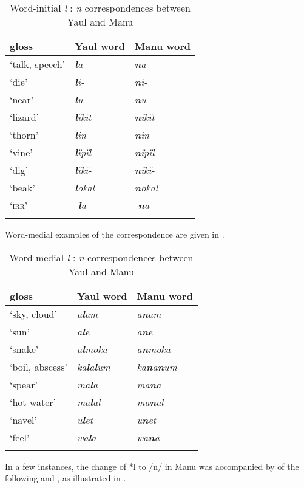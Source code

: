 \begin{table}
\caption{Word-initial \textit{l} : \textit{n} correspondences between Yaul and Manu}
\label{tab:18.2}


\begin{tabular}{lll}

\lsptoprule

gloss & Yaul word & Manu word\\
\midrule
‘talk, speech’ & {\itshape \textbf{l}a} & {\itshape \textbf{n}a}\\
‘die’ & {\itshape \textbf{l}i-} & {\itshape \textbf{n}i-}\\
‘near’ & {\itshape \textbf{l}u} & {\itshape \textbf{n}u}\\
‘lizard’ & {\itshape \textbf{l}ïkït} & {\itshape \textbf{n}ïkït}\\
‘thorn’ & {\itshape \textbf{l}in} & {\itshape \textbf{n}in}\\
‘vine’ & {\itshape \textbf{l}ïpïl} & {\itshape \textbf{n}ïpïl}\\
‘dig’ & {\itshape \textbf{l}ïkï-} & {\itshape \textbf{n}ïkï-}\\
‘beak’ & {\itshape \textbf{l}okal} & {\itshape \textbf{n}okal}\\
‘\textsc{irr}’ & {\itshape {}-\textbf{l}a} & {\itshape {}-\textbf{n}a}\\
\lspbottomrule
\end{tabular}
\end{table}
Word-medial examples of the correspondence are given in .


\begin{table}
\caption{Word-medial \textit{l} : \textit{n} correspondences between Yaul and Manu}
\label{tab:18.3}


\begin{tabular}{lll}

\lsptoprule

gloss & Yaul word & Manu word\\
\midrule
‘sky, cloud’ & {\itshape a\textbf{l}am} & {\itshape a\textbf{n}am}\\
‘sun’ & {\itshape a\textbf{l}e} & {\itshape a\textbf{n}e}\\
‘snake’ & {\itshape a\textbf{l}moka} & {\itshape a\textbf{n}moka}\\
‘boil, abscess’ & {\itshape ka\textbf{l}a\textbf{l}um} & {\itshape ka\textbf{n}a\textbf{n}um}\\
‘spear’ & {\itshape ma\textbf{l}a} & {\itshape ma\textbf{n}a}\\
‘hot water’ & {\itshape ma\textbf{l}al} & {\itshape ma\textbf{n}al}\\
‘navel’ & {\itshape u\textbf{l}et} & {\itshape u\textbf{n}et}\\
‘feel’ & {\itshape wa\textbf{l}a-} & {\itshape wa\textbf{n}a-}\\
\lspbottomrule
\end{tabular}
\end{table}
In a few instances, the change of *l to /n/ in Manu was accompanied by  of the following  and , as illustrated in .


